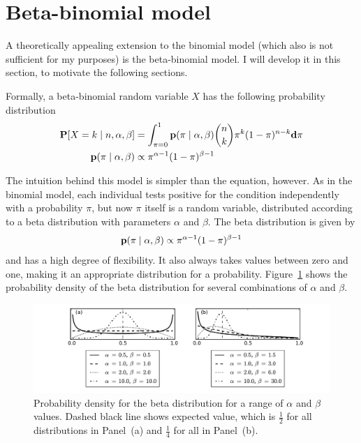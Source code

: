 \section{Beta-binomial model}
\label{beta-binomial-model}
A theoretically appealing extension to the binomial model (which also
is not sufficient for my purposes) is the beta-binomial model.  I will
develop it in this section, to motivate the following sections.

Formally, a beta-binomial random variable $X$ has the following
probability distribution
\begin{align*}
\mathbf{P}[X = k\;|\; n, \alpha, \beta]  &= \int_{\pi=0}^1 \mathbf{p}(\pi\;|\; \alpha, \beta) \binom{n}{k}\pi^k(1-\pi)^{n-k} \mathbf{d}\pi\\
\mathbf{p}(\pi\;|\; \alpha, \beta) &\propto \pi^{\alpha-1}(1-\pi)^{\beta-1}
\end{align*}

The intuition behind this model is simpler than the equation,
however. As in the binomial model, each individual tests positive for
the condition independently with a probability $\pi$, but now $\pi$
itself is a random variable, distributed according to a beta
distribution with parameters $\alpha$ and $\beta$. The beta
distribution is given by 
\[
\mathbf{p}(\pi\;|\; \alpha, \beta)
\propto \pi^{\alpha-1}(1-\pi)^{\beta-1}
\]
and has a high degree of flexibility.  It also always takes values
between zero and one, making it an appropriate distribution for a
probability.  Figure~\ref{rate-model-beta} shows the probability
density of the beta distribution for several combinations of $\alpha$
and $\beta$.
\begin{figure}[ht]
\begin{center}
\includegraphics[width=\textwidth]{beta-distribution.pdf}
\end{center}
\caption{Probability density for the beta distribution for a range of
  $\alpha$ and $\beta$ values. Dashed black line shows expected value,
  which is $\frac{1}{2}$ for all distributions in Panel~(a) and
  $\frac{1}{4}$ for all in Panel~(b).}
\label{rate-model-beta}
\end{figure}

